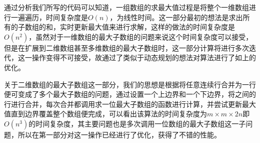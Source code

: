 \documentclass{article}
\begin{document}
\par 通过分析我们所写的代码可以知道，一组数组的求最大值过程是将整个一维数组进行一遍遍历，时间复杂度是$O(n)$，为线性时间。这一部分最初的想法是求出所有的子数组的和，实时更新最大值来进行求解，这样的做法的时间复杂度是$O(n^2)$，虽然对于一维数组的最大子数组的问题来说这个时间复杂度可以接受，但是在扩展到二维数组甚至多维数组的最大子数组时，这一部分计算将进行多次迭代，这一操作变得不可接受，故通过了类似于动态规划的想法对算法进行了如上的优化。
\par 关于二维数组的最大子数组这一部分，我们的思想是根据将任意连续行合并为一行便可变成了多个最大子数组的问题，通过设置一个上边界和一个下边界，将之间的行进行合并，每次合并都调用求一位最大子数组的函数进行计算，并尝试更新最大值直到边界覆盖整个数组便完成，可以看出该算法的时间复杂度为$m\times m \times 2n $即$O(n^3)$的时间复杂度，其主要问题也是多次调用一位数组的最大子数组这一子问题，所以在第一部分对这一操作已经进行了优化，获得了不错的性能。
\end{document}
